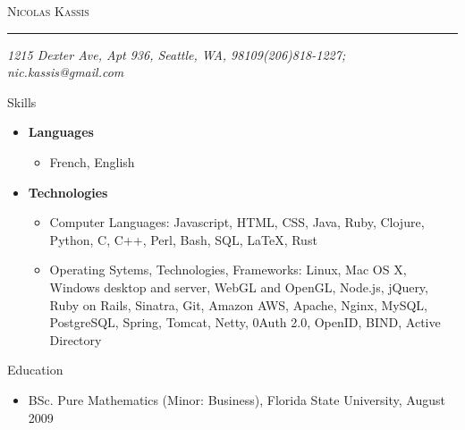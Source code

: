 \documentclass[10pt,oneside]{article}
\makeatletter
\newcommand{\name}{Nicolas Kassis}
\newcommand{\addr}{1215 Dexter Ave, Apt 936, Seattle, WA, 98109}
\newcommand{\phone}{(206)818-1227}
\newcommand{\email}{nic.kassis@gmail.com}
\newcommand{\bigname}[1]{
  \begin{center}\fontfamily{phv}\selectfont\Huge\scshape#1\end{center}
}
\newenvironment{ressection}[1]{
  \vspace{4pt}
	 {\fontfamily{phv}\selectfont\Large#1}
	 \begin{itemize}
	   \vspace{3pt}
}{
	 \end{itemize}
}
\newcommand{\resitem}[1]{
  \vspace{-4pt}
\item \begin{flushleft} #1 \end{flushleft}
}
\newcommand{\ressubitem}[1]{
  \vspace{-1pt}
\item \begin{flushleft} #1 \end{flushleft}
}
\newenvironment{reslist}[1]{
  \resitem{\textbf{#1}}
  \vspace{-5pt}
  \begin{itemize}
}{
  \end{itemize}
}
\makeatother
\begin{document}
 \selectfont

\bigname{\name}
\vspace{-8pt} \rule{\textwidth}{1pt}
\vspace{-1pt} {\small\itshape \addr \hfill \phone; \email}
\vspace{8 pt}

\begin{ressection}{Skills}
  \begin{reslist}{Languages}
    \ressubitem{French, English}
   \end{reslist}
   \begin{reslist}{Technologies}
    \ressubitem{Computer Languages: Javascript, HTML, CSS, Java, Ruby, Clojure, Python, C, C++, Perl, Bash,  SQL, \LaTeX, Rust}
    \ressubitem{Operating Sytems, Technologies, Frameworks: Linux, Mac OS X, Windows desktop and server, WebGL and OpenGL,  Node.js, jQuery, Ruby on Rails, Sinatra, Git, Amazon AWS, Apache, Nginx, MySQL, PostgreSQL, Spring, Tomcat, Netty, 0Auth 2.0, OpenID, BIND, Active Directory}
    \end{reslist}
\end{ressection}
\begin{ressection}{Education}
  \ressubitem{BSc. Pure Mathematics (Minor: Business), Florida State University, August 2009}
\end{ressection}
\end{document}
